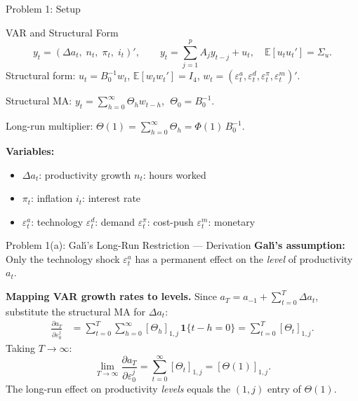 \documentclass[aspectratio=169,11pt]{beamer}
\newcommand{\E}{\mathbb{E}}
\begin{document}
\begin{frame}{Problem 1: Setup}
    \begin{block}{VAR and Structural Form}
        \vspace{-0.3em}
        \[
        y_t = (\Delta a_t,\; n_t,\; \pi_t,\; i_t)', \qquad y_t = \sum_{j=1}^p A_j y_{t-j} + u_t, \quad \E[u_t u_t'] = \Sigma_u.
        \]
        Structural form: $u_t = B_0^{-1} w_t$, $\E[w_t w_t'] = I_4$, $w_t = (\varepsilon_t^a, \varepsilon_t^d, \varepsilon_t^\pi, \varepsilon_t^m)'$.

        Structural MA: $y_t = \sum_{h=0}^\infty \Theta_h w_{t-h}$, $\;\Theta_0 = B_0^{-1}$.

        Long-run multiplier: $\Theta(1) = \sum_{h=0}^\infty \Theta_h = \Phi(1)\,B_0^{-1}$.
    \end{block}

    \vspace{0.3em}
    \textbf{Variables:}
    \begin{itemize}
        \item $\Delta a_t$: productivity growth \quad $n_t$: hours worked
        \item $\pi_t$: inflation \quad $i_t$: interest rate
        \item $\varepsilon_t^a$: technology \; $\varepsilon_t^d$: demand \; $\varepsilon_t^\pi$: cost-push \; $\varepsilon_t^m$: monetary
    \end{itemize}
\end{frame}

\begin{frame}{Problem 1(a): Gal\'{\i}'s Long-Run Restriction --- Derivation}
    \textbf{Gal\'{\i}'s assumption:} Only the technology shock $\varepsilon_t^a$ has a permanent effect on the \textit{level} of productivity $a_t$.

    \vspace{0.3em}
    \textbf{Mapping VAR growth rates to levels.} Since $a_T = a_{-1} + \sum_{t=0}^T \Delta a_t$, substitute the structural MA for $\Delta a_t$:
    \begin{align*}
        \frac{\partial a_T}{\partial \varepsilon_0^j}
        &= \sum_{t=0}^T \sum_{h=0}^\infty [\Theta_h]_{1,j}\,\mathbf{1}\{t - h = 0\}
        = \sum_{t=0}^T [\Theta_t]_{1,j}.
    \end{align*}
    Taking $T \to \infty$:
    \[
    \lim_{T\to\infty} \frac{\partial a_T}{\partial \varepsilon_0^j} = \sum_{t=0}^\infty [\Theta_t]_{1,j} = [\Theta(1)]_{1,j}.
    \]
    \textcolor{mitred}{The long-run effect on productivity \textit{levels} equals the $(1,j)$ entry of $\Theta(1)$.}
\end{frame}
\end{document}
